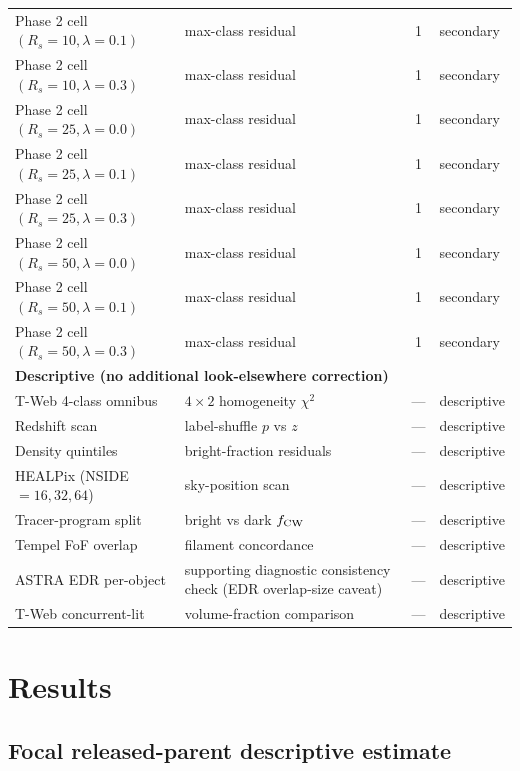 \documentclass[aps,prd,twocolumn,superscriptaddress,showpacs,preprintnumbers,nofootinbib,longbibliography,floatfix]{revtex4-2}
\begin{document}
\begin{table}[ht]
\begin{ruledtabular}
\begin{tabular}{llcl}
Phase 2 cell $(R_s=10,\lambda=0.1)$ & max-class residual & 1 & secondary \\
Phase 2 cell $(R_s=10,\lambda=0.3)$ & max-class residual & 1 & secondary \\
Phase 2 cell $(R_s=25,\lambda=0.0)$ & max-class residual & 1 & secondary \\
Phase 2 cell $(R_s=25,\lambda=0.1)$ & max-class residual & 1 & secondary \\
Phase 2 cell $(R_s=25,\lambda=0.3)$ & max-class residual & 1 & secondary \\
Phase 2 cell $(R_s=50,\lambda=0.0)$ & max-class residual & 1 & secondary \\
Phase 2 cell $(R_s=50,\lambda=0.1)$ & max-class residual & 1 & secondary \\
Phase 2 cell $(R_s=50,\lambda=0.3)$ & max-class residual & 1 & secondary \\
\hline
\multicolumn{4}{l}{\textbf{Descriptive (no additional look-elsewhere correction)}} \\
T-Web 4-class omnibus & $4\!\times\!2$ homogeneity $\chi^2$ & --- & descriptive \\
Redshift scan & label-shuffle $p$ vs $z$ & --- & descriptive \\
Density quintiles & bright-fraction residuals & --- & descriptive \\
HEALPix (NSIDE $=16,32,64$) & sky-position scan & --- & descriptive \\
Tracer-program split & bright vs dark $f_{\rm CW}$ & --- & descriptive \\
Tempel FoF overlap & filament concordance & --- & descriptive \\
ASTRA EDR per-object & supporting diagnostic consistency check (EDR overlap-size caveat) & --- & descriptive \\
T-Web concurrent-lit & volume-fraction comparison & --- & descriptive \\
\end{tabular}
\end{ruledtabular}
\end{table}

\section{Results}\label{sec:results}

\subsection{Focal released-parent descriptive estimate}\label{sec:focal_result_first}
\end{document}
